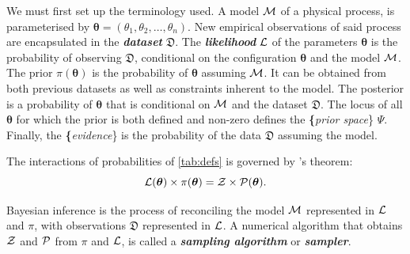 \documentclass[draft,usenatbib]{mnras}
\begin{document}
We must first set up the terminology used. A model \({\cal M}\) of
a physical process, is parameterised by \(\bm{\theta} =
   (\theta_{1}, \theta_{2}, \ldots , \theta_{n})\).  New empirical
observations of said process are encapsulated in the
\textbf{\emph{dataset}} \(\mathfrak{D}\).  The
\textbf{\emph{likelihood}} \({\cal L}\) of the parameters
\(\bm{\theta}\) is the probability of observing \(\mathfrak{D}\),
conditional on the configuration \(\bm{\theta}\) and the model \({\cal
   M}\).  The prior \(\pi(\bm{\theta})\) is the probability of
\(\bm{\theta}\) assuming \({\cal M}\). It can be obtained from both
previous datasets as well as constraints inherent to the model. The
posterior is a probability of \(\bm{\theta}\) that is conditional on
\({\cal M}\) and the dataset \({\mathfrak D}\). The locus of all
\(\bm{\theta}\) for which the prior is both defined and non-zero
defines the \textbf\{\emph{prior space}\} \(\Psi\). Finally, the
\textbf\{\emph{evidence}\} is the probability of the data
\({\mathfrak D}\) assuming the model.

The interactions of probabilities of \cref{tab:defs} is governed by
\citeauthor{1763} 's theorem:
\begin{equation}\label{eq:bayes}
{\cal L}(\bm{\theta}) \times \pi (\bm{\theta}) = {\cal Z} \times {\cal P} (\bm{\theta}).
\end{equation}

Bayesian inference is the process of reconciling the model \({\cal M}\)
represented in \({\cal L}\) and \(\pi\), with observations
\(\mathfrak{D}\) represented in \({\cal L}\). A numerical algorithm that
obtains \({\cal Z}\) and \({\cal P}\) from \(\pi\) and \({\cal L}\), is called
a \emph{\textbf{sampling algorithm}} or \textbf{\emph{sampler}}.
\end{document}
